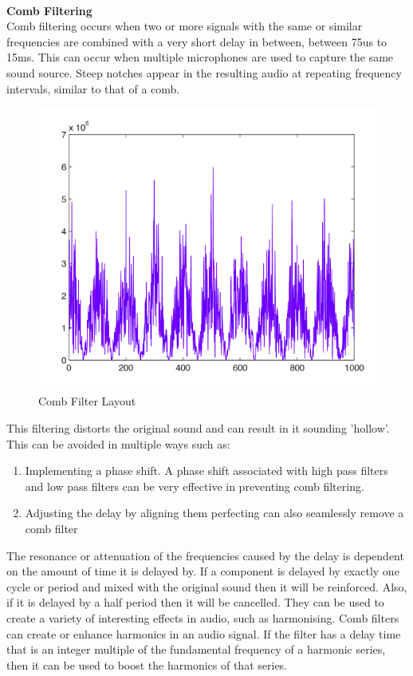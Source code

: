 \documentclass[12pt,a4paper]{article}
\begin{document}
			\\\textbf{Comb Filtering}\\
			Comb filtering occurs when two or more signals with the same or similar frequencies are combined with a very short delay in between, between 75us to 15ms\cite{COMB_2}. This can occur when multiple microphones are used to capture the same sound source. Steep notches appear in the resulting audio at repeating frequency intervals, similar to that of a comb.
			\begin{figure}[H]
				\begin{center}
					\includegraphics[width=0.5\linewidth]{Comb_Filter}
				\end{center}
				\caption{Comb Filter Layout}
			\end{figure}
			This filtering distorts the original sound and can result in it sounding 'hollow'. This can be avoided in multiple ways such as:\\
			\begin{enumerate}
				\item Implementing a phase shift. A phase shift associated with high pass filters and low pass filters can be very effective in preventing comb filtering.\\
				\item Adjusting the delay by aligning them perfecting can also seamlessly remove a comb filter\\
			\end{enumerate}  
			The resonance or attenuation of the frequencies caused by the delay is dependent on the amount of time it is delayed by\cite{COMB}. If a component is delayed by exactly one cycle or period and mixed with the original sound then it will be reinforced. Also, if it is delayed by a half period then it will be cancelled.
			They can be used to create a variety of interesting effects in audio, such as harmonising. Comb filters can create or enhance harmonics in an audio signal. If the filter has a delay time that is an integer multiple of the fundamental frequency of a harmonic series, then it can be used to boost the harmonics of that series. 
\end{document}
